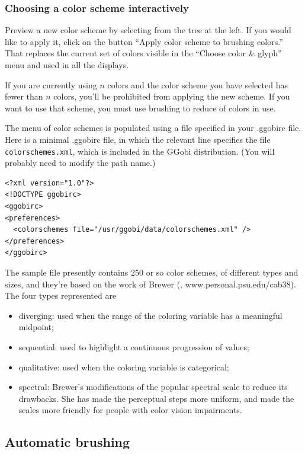\documentclass[11pt]{article}
\begin{document}
\subsubsection{Choosing a color scheme interactively}

Preview a new color scheme by selecting from the tree at the left.
If you would like to apply it, click on the button ``Apply color scheme
to brushing colors.''  That replaces the current set of colors visible
in the ``Choose color \& glyph'' menu and used in all the displays.

If you are currently using $n$ colors and the color scheme you have
selected has fewer than $n$ colors, you'll be prohibited from applying
the new scheme.  If you want to use that scheme, you must use brushing
to reduce of colors in use.

The menu of color schemes is populated using a file specified in your
.ggobirc file.  Here is a minimal .ggobirc file, in which the relevant
line specifies the file {\tt colorschemes.xml}, which is included in the
GGobi distribution.  (You will probably need to modify the path name.)

\begin{verbatim}
<?xml version="1.0"?>
<!DOCTYPE ggobirc>
<ggobirc>
<preferences>
  <colorschemes file="/usr/ggobi/data/colorschemes.xml" />
</preferences>
</ggobirc>
\end{verbatim}

The sample file presently contains 250 or so color schemes, of
different types and sizes, and they're based on the work of
Brewer (\cite{Brewer99}, www.personal.psu.edu/cab38).
The four types represented are

\begin{itemize}
\item diverging: used when the range of the coloring variable has
      a meaningful midpoint;
\item sequential: used to highlight a continuous progression of values;
\item qualitative: used when the coloring variable is categorical;
\item spectral: Brewer's modifications of the popular spectral scale
      to reduce its drawbacks.  She has made the perceptual steps
      more uniform, and made the scales more friendly for people with
      color vision impairments.
\end{itemize}

\subsection{Automatic brushing}
\label{slbl:AutoBrushing}
\end{document}
